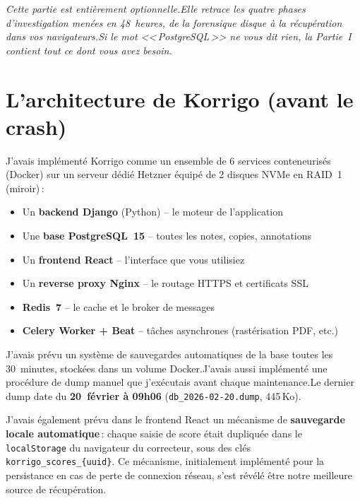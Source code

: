 \documentclass[11pt,a4paper]{article}
\begin{document}
\begin{graybox}
	\itshape\sffamily
	Cette partie est enti\`{e}rement optionnelle.\@ Elle retrace les quatre phases d'investigation men\'{e}es en 48~heures, de la forensique disque \`{a} la r\'{e}cup\'{e}ration dans vos navigateurs.\@ Si le mot <<\,PostgreSQL\,>> ne vous dit rien, la Partie~I contient tout ce dont vous avez besoin.
\end{graybox}

\section{L'architecture de Korrigo (avant le crash)}

J'avais impl\'{e}ment\'{e} Korrigo comme un ensemble de 6 services conteneuris\'{e}s (Docker) sur un serveur d\'{e}di\'{e} Hetzner \'{e}quip\'{e} de 2 disques NVMe en RAID~1 (miroir)\,:

\begin{itemize}
	\item Un \textbf{backend Django} (Python) -- le moteur de l'application
	\item Une \textbf{base PostgreSQL~15} -- toutes les notes, copies, annotations
	\item Un \textbf{frontend React} -- l'interface que vous utilisiez
	\item Un \textbf{reverse proxy Nginx} -- le routage HTTPS et certificats SSL
	\item \textbf{Redis~7} -- le cache et le broker de messages
	\item \textbf{Celery Worker + Beat} -- t\^{a}ches asynchrones (rast\'{e}risation PDF, etc.)
\end{itemize}

J'avais pr\'{e}vu un syst\`{e}me de sauvegardes automatiques de la base toutes les 30~minutes, stock\'{e}es dans un volume Docker.\@ J'avais aussi impl\'{e}ment\'{e} une proc\'{e}dure de dump manuel que j'ex\'{e}cutais avant chaque maintenance.\@ Le dernier dump date du \textbf{20~f\'{e}vrier \`{a} 09h06} (\texttt{db\_2026-02-20.dump}, 445\,Ko).

J'avais \'{e}galement pr\'{e}vu dans le frontend React un m\'{e}canisme de \textbf{sauvegarde locale automatique}\,: chaque saisie de score \'{e}tait dupliqu\'{e}e dans le \texttt{localStorage} du navigateur du correcteur, sous des cl\'{e}s \texttt{korrigo\_scores\_\{uuid\}}. Ce m\'{e}canisme, initialement impl\'{e}ment\'{e} pour la persistance en cas de perte de connexion r\'{e}seau, s'est r\'{e}v\'{e}l\'{e} \^{e}tre notre meilleure source de r\'{e}cup\'{e}ration.
\end{document}
